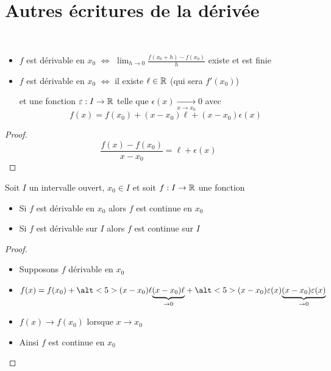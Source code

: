 

\section*{Autres écritures de la dérivée}


\begin{frame}
\begin{proposition}
\label{prop:ecrideriv}
\ 
\begin{itemize}
  \item $f$ est dérivable en $x_0$\!
$\iff$ \!$\displaystyle \lim_{h\to 0} \frac{f(x_0+h)-f(x_0)}{h}$ existe et est finie

\pause
\medskip

  \item $f$ est dérivable en $x_0$ 
$\iff$ il existe $\ell \in \mathbb{R}$ (qui sera $f'(x_0)$)

et une fonction $\varepsilon : I \to \mathbb{R}$ telle que $\epsilon(x) \xrightarrow[x\to x_0]{} 0$ avec
$$f(x)=f(x_0)+(x-x_0) \ell + (x-x_0) \epsilon(x)$$
\end{itemize}
\end{proposition}


\pause

\begin{proof}
$$\frac{f(x)-f(x_0)}{x-x_0} = \ell + \epsilon(x)$$
\end{proof}
\end{frame}



\begin{frame}
\begin{proposition}
Soit $I$ un intervalle ouvert, $x_0 \in I$ et soit $f : I \to \mathbb{R}$ une fonction
\pause
\begin{itemize}
  \item Si $f$ est dérivable en $x_0$ alors $f$ est continue en $x_0$
\pause
  \item Si $f$ est dérivable sur $I$ alors $f$ est continue sur $I$
\end{itemize}
\end{proposition}

\pause
\bigskip

\begin{proof}
\begin{itemize}
  \item Supposons $f$ dérivable en $x_0$
\pause
  \item $f(x)= f(x_0)+\alt<5>{(x-x_0) \ell\vphantom{\underbrace{(x-x_0) \ell}_{\to 0}}}{\underbrace{(x-x_0) \ell}_{\to 0}} + \alt<5>{(x-x_0) \epsilon(x)}{\underbrace{(x-x_0) \epsilon(x)}_{\to 0}}$
\pause \pause
  \item $f(x) \to f(x_0)$ lorsque $x \to x_0$
\pause
  \item Ainsi $f$ est continue en $x_0$
\end{itemize}
\vspace*{-2ex}
\end{proof}

\end{frame}



